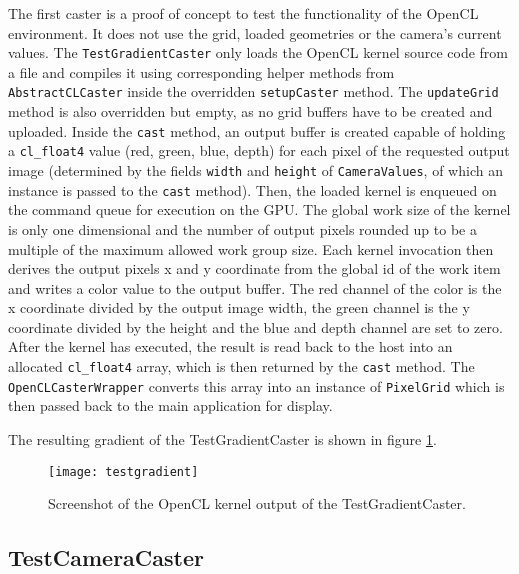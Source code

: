 The first caster is a proof of concept to test the functionality of the OpenCL environment. It does not use the grid, loaded geometries or the camera's current values. The \lstinline!TestGradientCaster! only loads the OpenCL kernel source code from a file and compiles it using corresponding helper methods from \lstinline!AbstractCLCaster! inside the overridden \lstinline!setupCaster! method. The \lstinline!updateGrid! method is also overridden but empty, as no grid buffers have to be created and uploaded. Inside the \lstinline!cast! method, an output buffer is created capable of holding a \lstinline!cl_float4! value (red, green, blue, depth) for each pixel of the requested output image (determined by the fields \lstinline!width! and \lstinline!height! of \lstinline!CameraValues!, of which an instance is passed to the \lstinline!cast! method). Then, the loaded kernel is enqueued on the command queue for execution on the GPU. The global work size of the kernel is only one dimensional and the number of output pixels rounded up to be a multiple of the maximum allowed work group size. Each kernel invocation then derives the output pixels x and y coordinate from the global id of the work item and writes a color value to the output buffer. The red channel of the color is the x coordinate divided by the output image width, the green channel is the y coordinate divided by the height and the blue and depth channel are set to zero. After the kernel has executed, the result is read back to the host into an allocated \lstinline!cl_float4! array, which is then returned by the \lstinline!cast! method. The \lstinline!OpenCLCasterWrapper! converts this array into an instance of \lstinline!PixelGrid! which is then passed back to the main application for display.

The resulting gradient of the TestGradientCaster is shown in figure \ref{fig:testgradient}.

\begin{figure}
\centering
\texttt{[image: testgradient]}
\caption{Screenshot of the OpenCL kernel output of the TestGradientCaster.}
\label{fig:testgradient}
\end{figure}


\subsection{TestCameraCaster}

